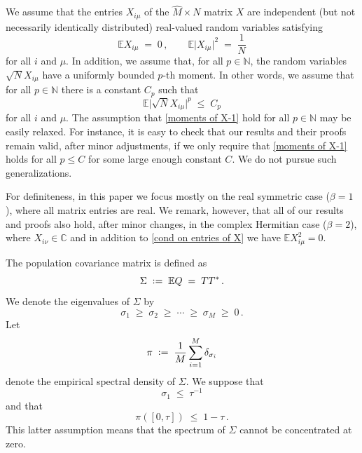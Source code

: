 \documentclass[11pt]{article} %
\newcommand{\nc}{\normalcolor}
\numberwithin{equation}{section}
\numberwithin{figure}{section}
\theoremstyle{plain} %
\theoremstyle{definition} %
\newcommand{\wh}{\widehat}
\newcommand{\E}{\mathbb{E}}
\newcommand{\C}{\mathbb{C}}
\newcommand{\N}{\mathbb{N}}
\newcommand*{\deq}{\mathrel{\vcenter{\baselineskip0.65ex \lineskiplimit0pt \hbox{.}\hbox{.}}}=}
\renewcommand{\leq}{\leqslant}
\renewcommand{\geq}{\geqslant}
\newcommand{\abs}[1]{\lvert #1 \rvert}
\newcommand{\absb}[1]{\bigl\lvert #1 \bigr\rvert}
\begin{document}
We assume that the entries $X_{i \mu}$ of the $\wh M \times N$ matrix $X$ are independent (but not necessarily identically distributed) real-valued random variables satisfying
\begin{equation} \label{cond on entries of X}
\E X_{i \mu}\;=\;0\,,\qquad \E \abs{X_{i \mu}}^2\;=\; \frac{1}{N}
\end{equation}
for all $i$ and $\mu$.
In addition, we assume that,  for all $p \in \N$, the random variables $\sqrt{N} X_{i \mu}$ have a uniformly bounded $p$-th moment. In other words, we assume that for all $p \in \N$ there is a constant $C_p$ such that
\begin{equation} \label{moments of X-1}
\E \absb{\sqrt{N} X_{i \mu}}^p \;\leq\; C_p
\end{equation}
for all $i$ and $\mu$.
The assumption that \eqref{moments of X-1} hold for all $p \in \N$ may be easily relaxed. For instance, it is easy to check that our results and their proofs remain valid, after minor adjustments, if we only require that \eqref{moments of X-1} holds for all $p \leq C$ for some large enough constant $C$. We do not pursue such generalizations. 

For definiteness, in this paper we focus mostly on the real symmetric case ($\beta = 1$), \nc where all matrix entries are real. We remark, however, that all of our results and proofs also hold, after minor changes, in the complex Hermitian case  ($\beta = 2$), \nc where $X_{i \nu} \in \C$ and in addition to \eqref{cond on entries of X} we have $\E X_{i \mu}^2 = 0$.

The population covariance matrix is defined as
\begin{equation*}
\Sigma \;\deq\; \E Q \;=\; T T^*\,.
\end{equation*}
We denote the eigenvalues of $\Sigma$ by
\begin{equation*}
\sigma_1 \;\geq\; \sigma_2 \;\geq\; \cdots \;\geq\; \sigma_M \;\geq\; 0\,.
\end{equation*}
Let
\begin{equation} \label{def_pi}
\pi \;\deq\; \frac{1}{M} \sum_{i = 1}^M \delta_{\sigma_i}
\end{equation}
denote the empirical spectral density of $\Sigma$.
We suppose that
\begin{equation} \label{bound_Sigma}
\sigma_1 \;\leq\; \tau^{-1}
\end{equation}
and that
\begin{equation} \label{Sigma_gap}
\pi ([0,\tau]) \;\leq\; 1 - \tau\,.
\end{equation}
This latter assumption means that the spectrum of $\Sigma$ cannot be concentrated at zero.
\end{document}
